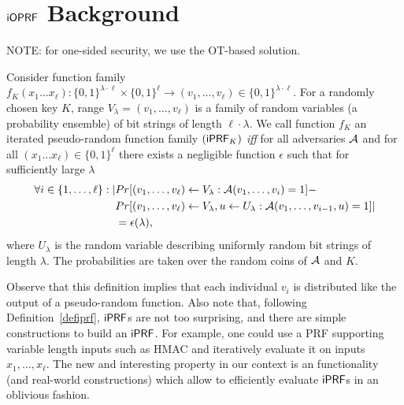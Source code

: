 \section{$\mathsf{i}\mathsf{OPRF}$ Background}
NOTE: for one-sided security, we use the OT-based solution.




\begin{definition}[$\iprf$]\label{defiprf}
  Consider function family
  $f_K(x_1\ldots{}x_\ell):\{0,1\}^{\lambda\cdot\ell}\times\{0,1\}^{\ell}\rightarrow{}(v_1,\ldots,v_\ell)\in\{0,1\}^{\lambda\cdot\ell}$. For
  a randomly chosen key $K$, range $V_\lambda=(v_1,\ldots,v_\ell)$ is
  a family of random variables (a probability ensemble) of bit strings
  of length $\ell\cdot\lambda$. We call function $f_K$ an iterated
  pseudo-random function family $(\mathsf{i}\mathsf{PRF}_K)$ \emph{iff}
  for all
  adversaries ${\mathcal{A}}$ and for all $(x_1\ldots{}x_\ell)\in\{0,1\}^\ell$
  there exists a negligible function $\epsilon$ such that for
  sufficiently large $\lambda$
\begin{align*}\forall{}i\in\{1,\ldots,\ell\}:|&Pr[(v_1,\ldots,v_\ell)\leftarrow{}V_\lambda:{\mathcal{A}}(v_1,\ldots,v_i)=1]-\\&Pr[(v_1,\ldots,v_\ell)\leftarrow{}V_\lambda,u\leftarrow{}U_\lambda:{\mathcal{A}}(v_1,\ldots,v_{i-1},u)=1]|\\&=\epsilon(\lambda),
  \end{align*}
  where $U_\lambda$ is the random variable describing uniformly random
  bit strings of length $\lambda$. The probabilities are taken over
  the random coins of ${\mathcal{A}}$ and $K$.
\end{definition}

Observe that this definition implies that each individual $v_i$ is
distributed like the output of a pseudo-random function. Also note
that, following Definition~\ref{defiprf}, $\iprf$s are not too
surprising, and there are simple constructions to build an
$\iprf$. For example, one could use a PRF supporting variable length
inputs such as HMAC and iteratively evaluate it on inputs
$x_1,\ldots,x_\ell$. The new and interesting property in our context
is an functionality (and real-world constructions) which allow to
efficiently evaluate $\iprf$s in an oblivious fashion.

